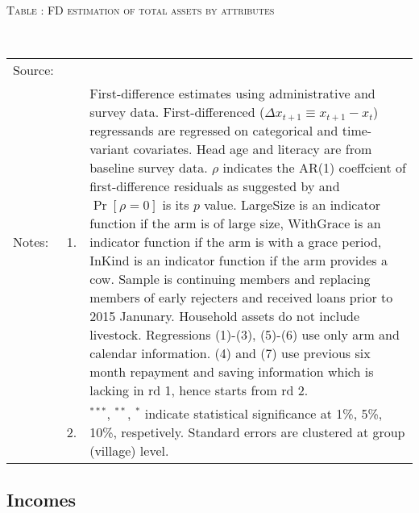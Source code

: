 \hspace{-1cm}\begin{minipage}[t]{14cm}
\hfil\textsc{\normalsize Table \thetable: FD estimation of total assets by attributes\label{tab FD total assets attributes original HHs}}\\
\setlength{\tabcolsep}{1pt}
\setlength{\baselineskip}{8pt}
\renewcommand{\arraystretch}{.55}
\hfil{}\\
\renewcommand{\arraystretch}{.8}
\setlength{\tabcolsep}{1pt}
\begin{tabular}{>{\hfill\scriptsize}p{1cm}<{}>{\hfill\scriptsize}p{.25cm}<{}>{\scriptsize}p{12cm}<{\hfill}}
Source:& \multicolumn{2}{l}{\scriptsize Estimated with GUK administrative and survey data.}\\
Notes: & 1. & First-difference estimates using administrative and survey data. First-differenced ($\Delta x_{t+1}\equiv x_{t+1} - x_{t}$) regressands are regressed on categorical and time-variant covariates. Head age and literacy are from baseline survey data. $\rho$ indicates the AR(1) coeffcient of first-difference residuals as suggested by \citet[][10.71]{Wooldridge2010} and $\Pr[\rho=0]$ is its $p$ value. \textsf{LargeSize} is an indicator function if the arm is of large size, \textsf{WithGrace} is an indicator function if the arm is with a grace period, \textsf{InKind} is an indicator function if the arm provides a cow. Sample is continuing members and replacing members of early rejecters and received loans prior to 2015 Janunary. Household assets do not include livestock. Regressions (1)-(3), (5)-(6) use only arm and calendar information. (4) and (7) use previous six month repayment and saving information which is lacking in rd 1, hence starts from rd 2.\\
& 2. & ${}^{***}$, ${}^{**}$, ${}^{*}$ indicate statistical significance at 1\%, 5\%, 10\%, respetively. Standard errors are clustered at group (village) level.
\end{tabular}
\end{minipage}



\subsection{Incomes}


